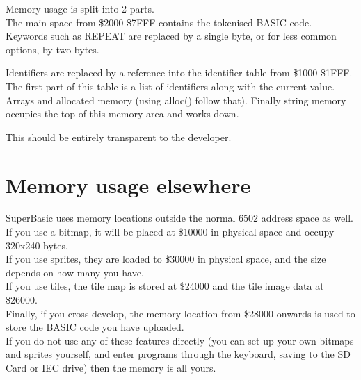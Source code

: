 Memory usage is split into 2 parts. \\

The main space from \$2000-\$7FFF contains the tokenised BASIC code. Keywords such as REPEAT are replaced by a single byte, or for less common options, by two bytes. 

Identifiers are replaced by a reference into the identifier table from \$1000-\$1FFF. The first part of this table is a list of identifiers along with the current value.
Arrays and allocated memory (using alloc() follow that).
Finally string memory occupies the top of this memory area and works down.

This should be entirely transparent to the developer.

\section{Memory usage elsewhere}

SuperBasic uses memory locations outside the normal 6502 address space as well. \\

If you use a bitmap, it will be placed at \$10000 in physical space and occupy 320x240 bytes.\\

If you use sprites, they are loaded to \$30000 in physical space, and the size depends on how many you have.\\

If you use tiles, the tile map is stored at \$24000 and the tile image data at \$26000. \\

Finally, if you cross develop, the memory location from \$28000 onwards is used to store the BASIC code you have uploaded.\\

If you do not use any of these features directly (you can set up your own bitmaps and sprites yourself, and enter programs through the keyboard, saving to the SD Card or IEC drive) then the memory is all yours.
